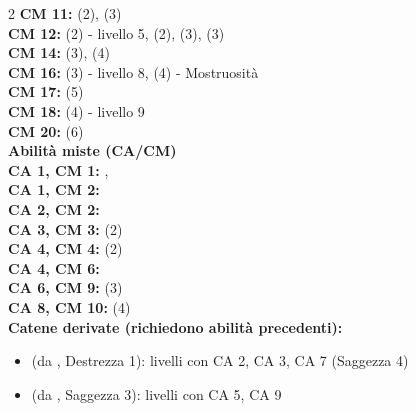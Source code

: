 \begin{multicols}{2}
	\textbf{CM 11:}  (2),  (3)\\

	\textbf{CM 12:}  (2) - livello 5,  (2),  (3),  (3)\\

	\textbf{CM 14:}  (3),  (4)\\

	\textbf{CM 16:}  (3) - livello 8,  (4) - Mostruosità\\

	\textbf{CM 17:}  (5)\\

	\textbf{CM 18:}  (4) - livello 9\\

	\textbf{CM 20:}  (6)\\

\textbf{{\large Abilità miste (CA/CM)}}\\

	\textbf{CA 1, CM 1:} , \\

	\textbf{CA 1, CM 2:} \\

	\textbf{CA 2, CM 2:} \\

	\textbf{CA 3, CM 3:}  (2)\\

	\textbf{CA 4, CM 4:}  (2)\\

	\textbf{CA 4, CM 6:} \\

	\textbf{CA 6, CM 9:}  (3)\\

	\textbf{CA 8, CM 10:}  (4)\\

	\textbf{Catene derivate (richiedono abilità precedenti):}
	\begin{itemize}
		\item {} (da , Destrezza 1): livelli con CA 2, CA 3, CA 7 (Saggezza 4)
		\item {} (da , Saggezza 3): livelli con CA 5, CA 9
	\end{itemize}


\end{multicols}
